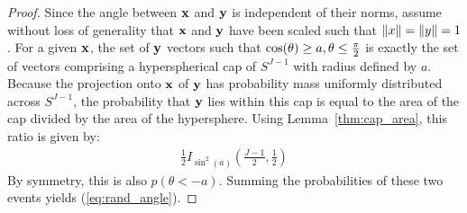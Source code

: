 \documentclass[]{article}
\newtheorem{lemma}{Lemma}[section]
\begin{document}
\begin{proof} Since the angle between $\mathbf{x}$ and $\mathbf{y}$ is independent of their norms, assume without loss of generality that $\mathbf{x}$ and $\mathbf{y}$ have been scaled such that $\lVert x\rVert = \lVert y\rVert = 1$. %
For a given $\mathbf{x}$, the set of $\mathbf{y}$ vectors such that $\cos(\theta) \ge a, \theta \le \frac{\pi}{2}$ is exactly the set of vectors comprising a hyperspherical cap of $S^{J-1}$ with radius defined by $a$.
Because the projection onto $\mathbf{x}$ of $\mathbf{y}$ has probability mass uniformly distributed across $S^{J-1}$, the probability that $\mathbf{y}$ lies within this cap is equal to the area of the cap divided by the area of the hypersphere. Using Lemma~\ref{thm:cap_area}, this ratio is given by:
\begin{align} \label{eq:beta_survival}
    \frac{1}{2} I_{\sin^2(a)} \left( \frac{J-1}{2}, \frac{1}{2} \right)
\end{align}
By symmetry, this is also $p(\theta < -a)$. Summing the probabilities of these two events yields (\ref{eq:rand_angle}).

%
\end{proof}



\end{document}
